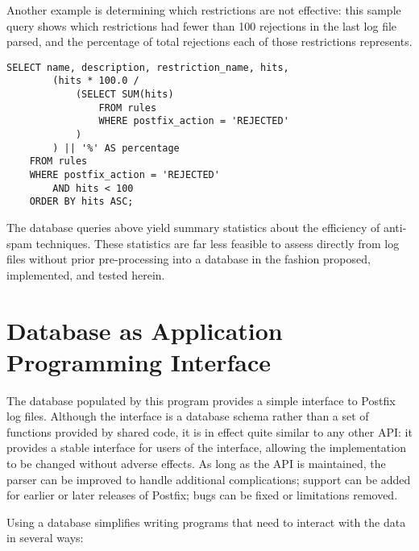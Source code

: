 Another example is determining which restrictions are not effective: this
sample query shows which restrictions had fewer than 100 rejections in the
last log file parsed, and the percentage of total rejections each of those
restrictions represents.

\begin{verbatim}
SELECT name, description, restriction_name, hits,
        (hits * 100.0 /
            (SELECT SUM(hits)
                FROM rules
                WHERE postfix_action = 'REJECTED'
            )
        ) || '%' AS percentage
    FROM rules
    WHERE postfix_action = 'REJECTED'
        AND hits < 100
    ORDER BY hits ASC;
\end{verbatim}

The database queries above yield summary statistics about the efficiency of
anti-spam techniques.  These statistics are far less feasible to assess
directly from log files without prior pre-processing into a database in the
fashion proposed, implemented, and tested herein.

\section{Database as Application Programming Interface}

\label{database as API}

The database populated by this program provides a simple interface to
Postfix log files.  Although the interface is a database schema rather than
a set of functions provided by shared code, it is in effect quite similar
to any other \gls{API}: it provides a stable interface for users of the
interface, allowing the implementation to be changed without adverse
effects.  As long as the \gls{API} is maintained, the parser can be
improved to handle additional complications; support can be added for
earlier or later releases of Postfix; bugs can be fixed or limitations
removed.

Using a database simplifies writing programs that need to interact with the
data in several ways:

